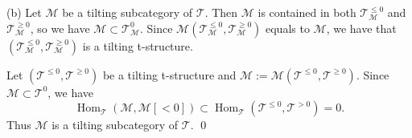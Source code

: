 \documentclass[a4paper,reqno]{amsart}
\theoremstyle{definition}
\newcommand{\TT}{{\mathcal T}}
\newcommand{\MM}{{\mathcal M}}
\newcommand{\Hom}{\operatorname{Hom}\nolimits}
\begin{document}
(b) Let $\MM$ be a tilting subcategory of $\TT$.
Then $\MM$ is contained in both $\TT_{\MM}^{\le0}$ and $\TT_{\MM}^{\ge0}$,
so we have $\MM\subset\TT_{\MM}^0$.
Since $\MM(\TT_{\MM}^{\le0},\TT_{\MM}^{\ge0})$ equals to $\MM$,
we have that $(\TT_{\MM}^{\le0},\TT_{\MM}^{\ge0})$ is a tilting t-structure.

Let $(\TT^{\le0},\TT^{\ge0})$ be a tilting t-structure and $\MM:=\MM(\TT^{\le0},\TT^{\ge0})$. Since $\MM\subset\TT^0$, we have
\[\Hom_{\TT}(\MM,\MM[<0])\subset\Hom_{\TT}(\TT^{\le0},\TT^{>0})=0.\]
Thus $\MM$ is a tilting subcategory of $\TT$.
\qed

\end{document}

